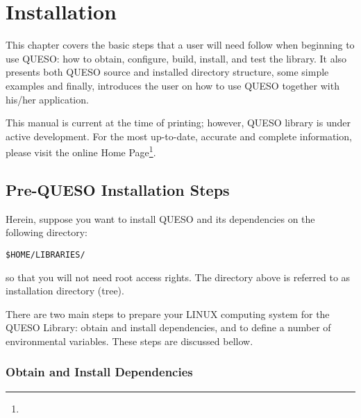 \chapter{Installation}\label{ch-install}
\thispagestyle{headings}


  
This chapter covers the basic steps that a user will need follow when beginning to use QUESO: 
how to obtain, configure, build, install, and test the library.  It also presents both QUESO source and installed directory structure, some simple examples and finally,  introduces the user on how to use QUESO together with his/her application.

This manual is current at the time of
printing; however, QUESO library  is under active development. For the most up-to-date, accurate and complete information,
please visit the online \Queso{} Home Page\footnote{\Quesoweb}.



        
\section{Pre-QUESO Installation Steps}\label{sec:Pre_Queso}


Herein, suppose you want to install QUESO and its dependencies on the following directory:
\begin{lstlisting}
$HOME/LIBRARIES/
\end{lstlisting}
%
so that you will not need root access rights. The directory above is referred  to  as \Queso{} installation directory (tree).

There are two main steps to prepare your LINUX computing system  for  the QUESO Library: obtain and install \Queso{} dependencies, and to define a number of environmental variables. These steps are discussed bellow.


\subsection{Obtain and Install \Queso{} Dependencies}

